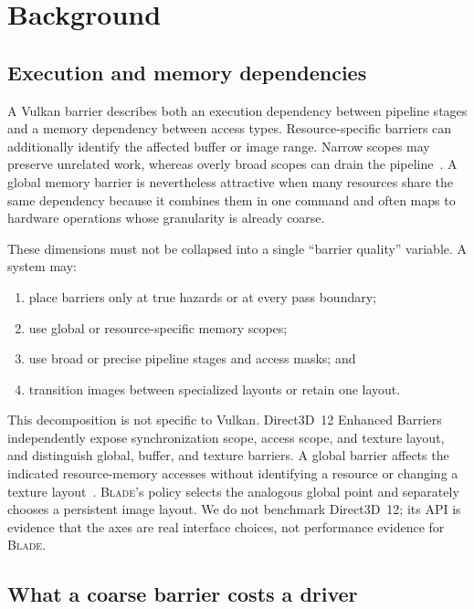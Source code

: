 \documentclass[10pt,twocolumn]{article}
\newcommand{\blade}{\textsc{Blade}}
\begin{document}
\section{Background}

\subsection{Execution and memory dependencies}

A Vulkan barrier describes both an execution dependency between pipeline
stages and a memory dependency between access types. Resource-specific
barriers can additionally identify the affected buffer or image range.
Narrow scopes may preserve unrelated work, whereas overly broad scopes can
drain the pipeline~\cite{amd-barriers,nvidia-vulkan-tips}. A global memory
barrier is nevertheless attractive when many resources share the same
dependency because it combines them in one command and often maps to hardware
operations whose granularity is already coarse.

These dimensions must not be collapsed into a single ``barrier quality''
variable. A system may:

\begin{enumerate}
  \item place barriers only at true hazards or at every pass boundary;
  \item use global or resource-specific memory scopes;
  \item use broad or precise pipeline stages and access masks; and
  \item transition images between specialized layouts or retain one layout.
\end{enumerate}

This decomposition is not specific to Vulkan. Direct3D~12 Enhanced Barriers
independently expose synchronization scope, access scope, and texture layout,
and distinguish global, buffer, and texture barriers. A global barrier affects
the indicated resource-memory accesses without identifying a resource or
changing a texture layout~\cite{d3d12-enhanced-barriers}. \blade's policy
selects the analogous global point and separately chooses a persistent image
layout. We do not benchmark Direct3D~12; its API is evidence that the axes are
real interface choices, not performance evidence for \blade.

\subsection{What a coarse barrier costs a driver}
\label{sec:radv-barriers}
\end{document}
